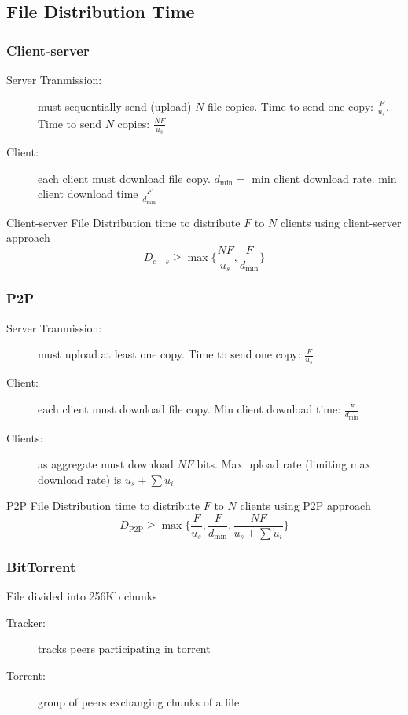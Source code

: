 \subsection{File Distribution Time}
\subsubsection{Client-server}
\begin{description}
	\item[Server Tranmission:] must sequentially send (upload) $N$ file copies. Time to send one copy: $\frac{F}{u_s}$. Time to send $N$ copies: $\frac{NF}{u_s}$
	\item[Client:] each client must download file copy. $d_\text{min}=$ min client download rate. min client download time $\frac{F}{d_\text{min}}$
\end{description}
\begin{note}{Client-server File Distribution}
	time to distribute $F$ to $N$ clients using client-server approach
	\[ D_{c-s}\geq\max\{ \frac{NF}{u_s},\frac{F}{d_\text{min}} \} \]
\end{note}
\subsubsection{P2P}
\begin{description}
	\item[Server Tranmission:] must upload at least one copy. Time to send one copy: $\frac{F}{u_s}$
	\item[Client:] each client must download file copy. Min client download time: $\frac{F}{d_\text{min}}$
	\item[Clients:] as aggregate must download $NF$ bits. Max upload rate (limiting max download rate) is $u_s+\sum u_i$
\end{description}
\begin{note}{P2P File Distribution}
	time to distribute $F$ to $N$ clients using P2P approach
	\[ D_\text{P2P}\geq\max\{\frac{F}{u_s},\frac{F}{d_\text{min}},\frac{NF}{u_s+\sum u_i} \} \]
\end{note}
\subsubsection{BitTorrent}
File divided into 256Kb chunks
\begin{description}
	\item[Tracker:] tracks peers participating in torrent
	\item[Torrent:] group of peers exchanging chunks of a file
\end{description}

